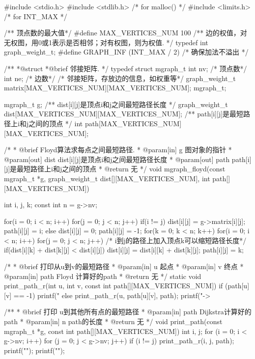 \begin{Codex}[label=mgraph_floyd.c]
#include <stdio.h>
#include <stdlib.h>  /* for malloc() */
#include <limits.h>  /* for INT_MAX */

/** 顶点数的最大值*/
#define MAX_VERTICES_NUM 100
/** 边的权值，对无权图，用0或1表示是否相邻；对有权图，则为权值. */
typedef int graph_weight_t;
#define GRAPH_INF (INT_MAX / 2)   /* 确保加法不溢出 */

/**
 *@struct
 *@brief 邻接矩阵.
 */
typedef struct mgraph_t {
    int nv; /* 顶点数*/
    int ne; /* 边数*/
    /* 邻接矩阵，存放边的信息，如权重等*/
    graph_weight_t matrix[MAX_VERTICES_NUM][MAX_VERTICES_NUM];
} mgraph_t;


mgraph_t g;
/** dist[i][j]是顶点i和j之间最短路径长度 */
graph_weight_t dist[MAX_VERTICES_NUM][MAX_VERTICES_NUM];
/** path[i][j]是最短路径上i和j之间的顶点 */
int path[MAX_VERTICES_NUM][MAX_VERTICES_NUM];


/*
  * @brief Floyd算法求每点之间最短路径.
  * @param[in] g 图对象的指针
  * @param[out] dist dist[i][j]是顶点i和j之间最短路径长度
  * @param[out] path path[i][j]是最短路径上i和j之间的顶点
  * @return 无
  */
void mgraph_floyd(const mgraph_t *g,
       graph_weight_t dist[][MAX_VERTICES_NUM],
       int path[][MAX_VERTICES_NUM]) {
    int i, j, k;
    const int n = g->nv;

    for(i = 0; i < n; i++) {
        for(j = 0; j < n; j++) {
            if(i != j) {
                dist[i][j] = g->matrix[i][j];
                path[i][j] = i;
            } else {
                dist[i][j] = 0;
                path[i][j] = -1;
            }
        }
    }
    for(k = 0; k < n; k++) {
        for(i = 0; i < n; i++) {
            for(j = 0; j < n; j++) {
                /* i到j的路径上加入顶点k可以缩短路径长度*/
                if(dist[i][k] + dist[k][j] < dist[i][j]) {
                    dist[i][j] = dist[i][k] + dist[k][j];
                    path[i][j] = k;
                }
            }
        }
    }
}

/*
 * @brief 打印从u到v的最短路径
 * @param[in] u 起点
 * @param[in] v 终点
 * @param[in] path Floyd 计算好的path
 * @return 无
 */
static void print_path_r(int u, int v, const int path[][MAX_VERTICES_NUM]) {
    if (path[u][v] == -1) {
        printf("%
    } else {
        print_path_r(u, path[u][v], path);
        printf("->%
    }
}

/**
 * @brief 打印 u到其他所有点的最短路径
 * @param[in] path Dijkstra计算好的path
 * @param[in] n path的长度
 * @return 无
 */
void print_path(const mgraph_t *g, const int path[][MAX_VERTICES_NUM]) {
    int i, j;
    for (i = 0; i < g->nv; i++) {
        for (j = 0; j < g->nv; j++) {
            if (i != j) {
                print_path_r(i, j, path);
                printf("\n");
            }
        }
        printf("\n");
    }
}


\end{Codex}
